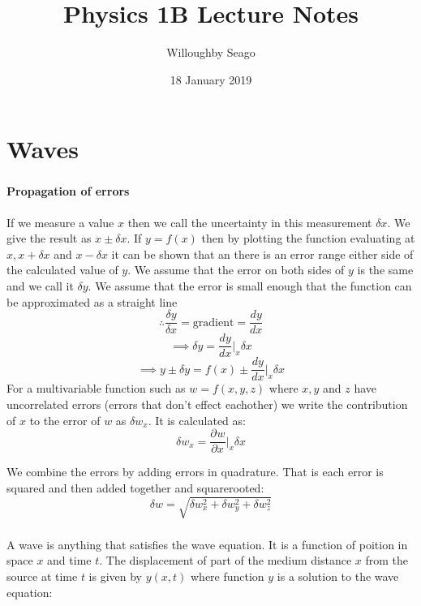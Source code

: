 \documentclass{article}
\title{Physics 1B Lecture Notes}
\author{Willoughby Seago}
\date{18 January 2019}
\newcommand{\pd}[3][]{\frac{\partial^{#1}{#2}}{\partial{#3}^{#1}}}
\begin{document}
\maketitle

\tableofcontents
\newpage

\part{Waves}
\section{}

\subsection*{Propagation of errors}

If we measure a value \(x\) then we call the uncertainty in this measurement \(\delta x\). We give the result as \(x\pm\delta x\). If \(y=f(x)\) then by plotting the function evaluating at \(x,x+\delta x\) and \(x-\delta x\) it can be shown that an there is an error range either side of the calculated value of \(y\). We assume that the error on both sides of \(y\) is the same and we call it \(\delta y\). We assume that the error is small enough that the function can be approximated as a straight line
\[\therefore \frac{\delta y}{\delta x}=\text{gradient}=\frac{dy}{dx}\]
\[\implies\delta y=\frac{dy}{dx}\biggr|_x\delta x\]
\[\implies y\pm\delta y=f(x)\pm\frac{dy}{dx}\biggr|_x\delta x\]
For a multivariable function such as \(w=f(x,y,z)\) where \(x,y\) and \(z\) have uncorrelated errors (errors that don't effect eachother) we write the contribution of \(x\) to the error of \(w\) as \(\delta w_x\). It is calculated as:
\[\delta w_x=\pd wx\biggr|_x\delta x\]

We combine the errors by adding errors in quadrature. That is each error is squared and then added together and squarerooted:
\[\delta w=\sqrt{\delta w_x^2+\delta w_y^2+\delta w_z^2}\]

\section{}

A wave is anything that satisfies the wave equation. It is a function of poition in space \(x\) and time \(t\). The displacement of part of the medium distance \(x\) from the source at time \(t\) is given by \(y(x,t)\) where function \(y\) is a solution to the wave equation:
\begin{center}
\boxed{\pd[2]yt=v^2\pd[2]yx}
\end{center}
\end{document}
